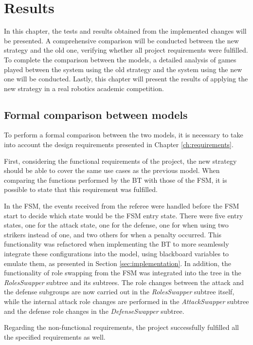 \chapter{Results}
\label{ch:results}

In this chapter, the tests and results obtained from the implemented changes will be presented. A comprehensive comparison will be conducted between the new strategy and the old one, verifying whether all project requirements were fulfilled. To complete the comparison between the models, a detailed analysis of games played between the system using the old strategy and the system using the new one will be conducted. Lastly, this chapter will present the results of applying the new strategy in a real robotics academic competition.

\section{Formal comparison between models}

To perform a formal comparison between the two models, it is necessary to take into account the design requirements presented in Chapter \ref{ch:requirements}.

First, considering the functional requirements of the project, the new strategy should be able to cover the same use cases as the previous model. When comparing the functions performed by the BT with those of the FSM, it is possible to state that this requirement was fulfilled.

In the FSM, the events received from the referee were handled before the FSM start to decide which state would be the FSM entry state. There were five entry states, one for the attack state, one for the defense, one for when using two strikers instead of one, and two others for when a penalty occurred. This functionality was refactored when implementing the BT to more seamlessly integrate these configurations into the model, using blackboard variables to emulate them, as presented in Section \ref{sec:implementation}. In addition, the functionality of role swapping from the FSM was integrated into the tree in the \textit{RolesSwapper} subtree and its subtrees. The role changes between the attack and the defense subgroups are now carried out in the \textit{RolesSwapper} subtree itself, while the internal attack role changes are performed in the \textit{AttackSwapper} subtree and the defense role changes in the \textit{DefenseSwapper} subtree.

Regarding the non-functional requirements, the project successfully fulfilled all the specified requirements as well.

